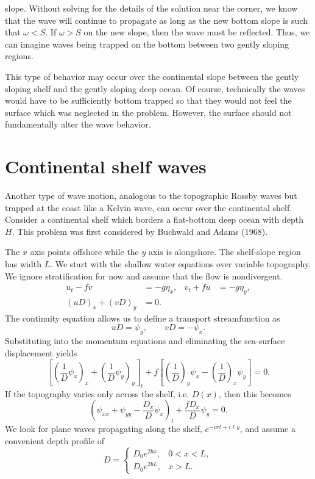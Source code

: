 slope. Without solving for the details of the solution near the corner, we know that the
wave will continue to propagate as long as the new bottom slope is such that
$\omega<S$. If $\omega>S$ on the new slope, then the wave must be reflected. Thus, we
can imagine waves being trapped on the bottom between two gently sloping regions.


This type of behavior may occur over the continental slope between the gently sloping
shelf and the gently sloping deep ocean. Of course, technically the waves would have to
be sufficiently bottom trapped so that they would not feel the surface which was
neglected in the problem. However, the surface should not fundamentally alter the wave
behavior.

\section{Continental shelf waves}

Another type of wave motion, analogous to the topographic Rossby waves but trapped at
the coast like a Kelvin wave, can occur over the continental shelf. Consider a
continental shelf which borders a flat-bottom deep ocean with depth $H$. This problem
was first considered by Buchwald and Adams (1968).

\sourcepagebreak


The $x$ axis points offshore while the $y$ axis is alongshore. The shelf-slope region has
width $L$. We start with the shallow water equations over variable topography. We
ignore stratification for now and assume that the flow is nondivergent.
\begin{align*}
	u_t-fv        & =-g\eta_x,
	              & v_t+fu     & =-g\eta_y, \\
	(uD)_x+(vD)_y & =0.
\end{align*}
The continuity equation allows us to define a transport streamfunction as
\[
	uD=\psi_y,
	\qquad
	vD=-\psi_x.
\]
Substituting into the momentum equations and eliminating the sea-surface displacement
yields
\[
	\left[
		\left(\frac{1}{D}\psi_x\right)_x
		+\left(\frac{1}{D}\psi_y\right)_y
		\right]_t
	+f\left[
		\left(\frac{1}{D}\right)_y\psi_x
		-\left(\frac{1}{D}\right)_x\psi_y
		\right]=0.
\]
If the topography varies only across the shelf, i.e. $D(x)$, then this becomes
\[
	\left(\psi_{xx}+\psi_{yy}-\frac{D_x}{D}\psi_x\right)_t
	+\frac{fD_x}{D}\psi_y=0.
\]
We look for plane waves propagating along the shelf, $e^{-i\sigma t+i\ell y}$, and
assume a convenient depth profile of
\[
	D=\begin{cases}
		D_0e^{2bx}, & 0<x<L, \\
		D_0e^{2bL}, & x>L.
	\end{cases}
\]

